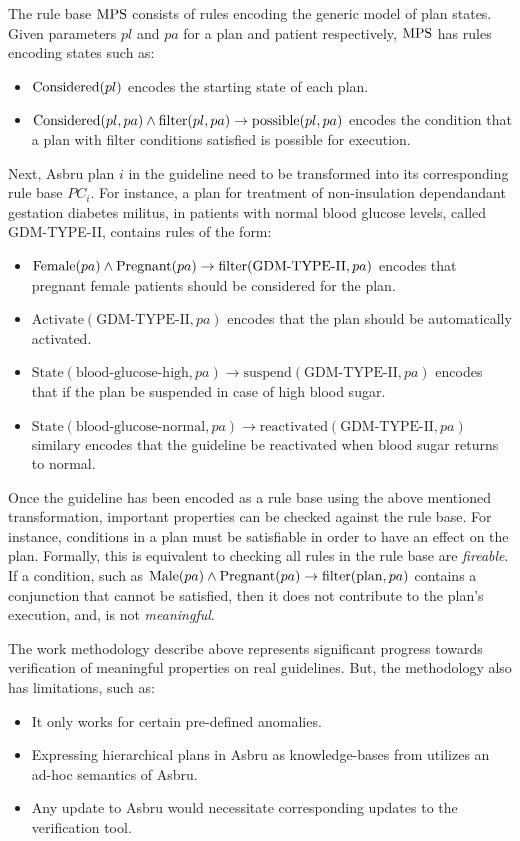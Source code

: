 The rule base $\text{MPS}{}$ consists of rules encoding the generic model of plan
states. Given parameters $pl$ and $pa$ for a plan and patient respectively,
$\text{MPS}{}$ has rules encoding states such as:
\begin{itemize}
  \item $\text{Considered}(pl)$ encodes the starting state of each plan.
  \item $\text{Considered}(pl,pa) \wedge \text{filter}(pl,pa) \to \text{possible}(pl,pa)$
    encodes the condition that a plan with filter conditions satisfied
    is possible for execution.
\end{itemize}

Next, Asbru plan $i$ in the guideline need to be transformed into
its corresponding rule base $PC_i$. For instance, a plan for
treatment of non-insulation dependandant gestation diabetes militus,
in patients with normal blood glucose levels, called GDM-TYPE-II,
contains rules of the form:
\begin{itemize}
  \item $\text{Female}(pa) \wedge \text{Pregnant}(pa) \to \text{filter}(\text{GDM-TYPE-II}, pa)$
    encodes that pregnant female patients should be considered for the plan.
  \item $\text{Activate}(\text{GDM-TYPE-II}, pa)$ encodes that the plan should
    be automatically activated.
  \item $\text{State}(\text{blood-glucose-high}, pa) \to \text{suspend}(\text{GDM-TYPE-II},pa)$
    encodes that if the plan be suspended in case of high blood sugar.
  \item $\text{State}(\text{blood-glucose-normal}, pa) \to \text{reactivated}(\text{GDM-TYPE-II},pa)$
    similary encodes that the guideline be reactivated when blood sugar returns
    to normal.
\end{itemize}

Once the guideline has been encoded as a rule base using the above mentioned
transformation, important properties can be checked against the rule base.
For instance, conditions in a plan must be satisfiable in order to
have an effect on the plan. Formally, this is equivalent to checking
all rules in the rule base are \emph{fireable}. If a condition,
such as $\text{Male}(pa) \wedge \text{Pregnant}(pa) \to \text{filter}(\text{plan}, pa)$
contains a conjunction that cannot be satisfied, then it does not contribute
to the plan's execution, and, is not \emph{meaningful}.

The work methodology describe above represents significant progress towards
verification of meaningful properties on real guidelines. But, the methodology
also has limitations, such as:
\begin{itemize}
  \item It only works for certain pre-defined anomalies.
  \item Expressing hierarchical plans in Asbru as knowledge-bases from
    \cite{PreeceJIS94} utilizes an ad-hoc semantics of Asbru.
  \item Any update to Asbru would necessitate corresponding updates to
    the verification tool.
\end{itemize}

